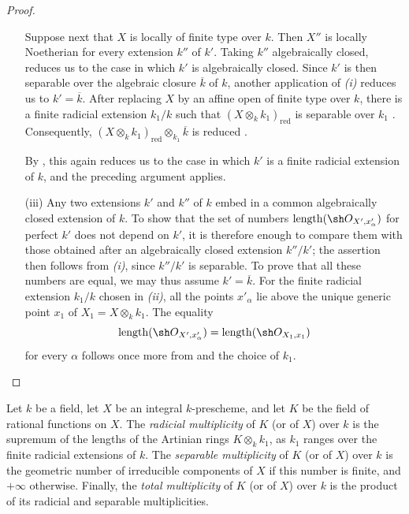 \begin{proof}
\begin{enumerate}
Suppose next that $X$ is locally of finite type over $k$.
Then $X''$ is locally Noetherian for every extension $k''$ of $k'$.
Taking $k''$ algebraically closed,  reduces us to
the case in which $k'$ is algebraically closed.
Since $k'$ is then separable over the algebraic closure $\overline k$
of $k$, another application of \emph{(i)} reduces us to
$k'=\overline k$.
After replacing $X$ by an affine open of finite type over $k$, there
is a finite radicial extension $k_1/k$ such that
$(X\otimes_k k_1)_{\mathrm{red}}$ is separable over $k_1$
.
Consequently,
$(X\otimes_k k_1)_{\mathrm{red}}\otimes_{k_1}\overline k$ is reduced
.

By , this again reduces us to the case in which
$k'$ is a finite radicial extension of $k$, and the preceding
argument applies.

\item[\rm(iii)]
Any two extensions $k'$ and $k''$ of $k$ embed in a common
algebraically closed extension of $k$.
To show that the set of numbers
$\operatorname{length}(\sh O_{X',x'_\alpha})$ for perfect $k'$ does
not depend on $k'$, it is therefore enough to compare them with those
obtained after an algebraically closed extension $k''/k'$; the
assertion then follows from \emph{(i)}, since $k''/k'$ is separable.
To prove that all these numbers are equal, we may thus assume
$k'=\overline k$.
For the finite radicial extension $k_1/k$ chosen in \emph{(ii)}, all
the points $x'_\alpha$ lie above the unique generic point $x_1$ of
$X_1=X\otimes_k k_1$.
The equality
\[
\operatorname{length}(\sh O_{X',x'_\alpha})
=\operatorname{length}(\sh O_{X_1,x_1})
\]
for every $\alpha$ follows once more from  and the
choice of $k_1$.
\end{enumerate}
\end{proof}

\begin{definition}[4.7.4]
\label{IV.4.7.4}
Let $k$ be a field, let $X$ be an integral $k$-prescheme, and let $K$
be the field of rational functions on $X$.
The \emph{radicial multiplicity} of $K$ (or of $X$) over $k$ is the
supremum of the lengths of the Artinian rings $K\otimes_k k_1$, as
$k_1$ ranges over the finite radicial extensions of $k$.
The \emph{separable multiplicity} of $K$ (or of $X$) over $k$ is the
geometric number of irreducible components of $X$ if this number is
finite, and $+\infty$ otherwise.
Finally, the \emph{total multiplicity} of $K$ (or of $X$) over $k$ is
the product of its radicial and separable multiplicities.
\end{definition}

